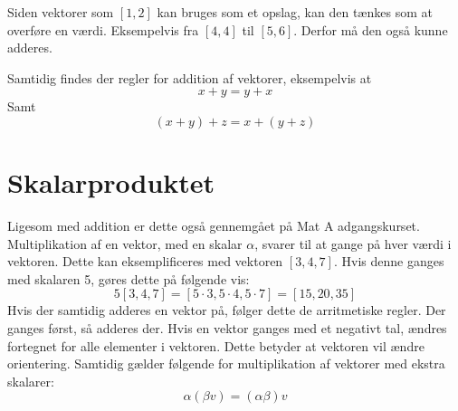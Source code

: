 Siden vektorer som $[1,2]$ kan bruges som et opslag, kan den tænkes som at overføre en værdi.
Eksempelvis fra $[4,4]$ til $[5,6]$.
Derfor må den også kunne adderes.

Samtidig findes der regler for addition af vektorer, eksempelvis at
\begin{equation}
	x+y=y+x
\end{equation}
Samt
\begin{equation}
	(x+y)+z=x+(y+z)
\end{equation}

\section{Skalarproduktet}
Ligesom med addition er dette også gennemgået på Mat A adgangskurset.
Multiplikation af en vektor, med en skalar $\alpha$, svarer til at gange på hver værdi i vektoren.
Dette kan eksemplificeres med vektoren $[3,4,7]$.
Hvis denne ganges med skalaren 5, gøres dette på følgende vis:
\begin{equation}
	\label{eqn:scalar}
	5[3,4,7] = [5\cdot3,5\cdot4,5\cdot7] = [15,20,35]
\end{equation}
Hvis der samtidig adderes en vektor på, følger dette de arritmetiske regler. 
Der ganges først, så adderes der.
Hvis en vektor ganges med et negativt tal, ændres fortegnet for alle elementer i vektoren.
Dette betyder at vektoren vil ændre orientering.
Samtidig gælder følgende for multiplikation af vektorer med ekstra skalarer:
\begin{equation}
	\label{eqn:scalar_mult}
	\alpha(\beta v)=(\alpha\beta)v
\end{equation}

